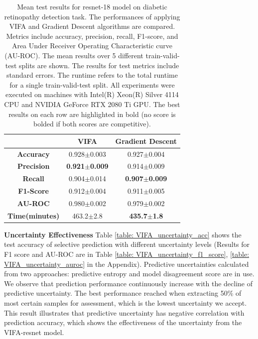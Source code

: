 \documentclass[10pt]{article} %
\begin{document}
\begin{table}[!htp]
\caption{Mean test results for resnet-18 model on diabetic retinopathy detection task. The performances of applying VIFA and Gradient Descent algorithms are compared. Metrics include accuracy, precision, recall, F1-score, and Area Under Receiver Operating Characteristic curve (AU-ROC). The mean results over 5 different train-valid-test splits are shown. The results for test metrics include standard errors. The runtime refers to the total runtime for a single train-valid-test split. All experiments were executed on machines with Intel(R) Xeon(R) Silver 4114 CPU and NVIDIA GeForce RTX 2080 Ti GPU. The best results on each row are highlighted in bold (no score is bolded if both scores are competitive).}
\label{table: VIFA_GD_comparison}
\begin{center}
\begin{tabular}{c|c|c}
                   & \textbf{VIFA}        & \textbf{Gradient Descent} \\ \hline
\textbf{Accuracy}  & 0.928$\pm$0.003 & 0.927$\pm$0.004               \\
\textbf{Precision} & \textbf{0.921$\pm$0.009} & 0.914$\pm$0.009               \\
\textbf{Recall}    & 0.904$\pm$0.014 & \textbf{0.907$\pm$0.009}               \\
\textbf{F1-Score}  & 0.912$\pm$0.004 & 0.911$\pm$0.005              \\
\textbf{AU-ROC}    & 0.980$\pm$0.002          & 0.979$\pm$0.002      \\
\textbf{Time(minutes)}      & 463.2$\pm$2.8        & \textbf{435.7$\pm$1.8}   
\end{tabular}
\end{center}
\end{table}

\textbf{Uncertainty Effectiveness} Table \ref{table: VIFA_uncertainty_acc} shows the test accuracy of selective prediction with different uncertainty levels (Results for F1 score and AU-ROC are in Table \ref{table: VIFA_uncertainty_f1_score}, \ref{table: VIFA_uncertainty_auroc} in the Appendix). Predictive uncertainties calculated from two approaches: predictive entropy and model disagreement score are in use. We observe that prediction performance continuously increase with the decline of predictive uncertainty. The best performance reached when extracting 50\% of most certain samples for assessment, which is the lowest uncertainty we accept.
This result illustrates that predictive uncertainty has negative correlation with prediction accuracy, which shows the effectiveness of the uncertainty from the VIFA-resnet model. 
\end{document}
